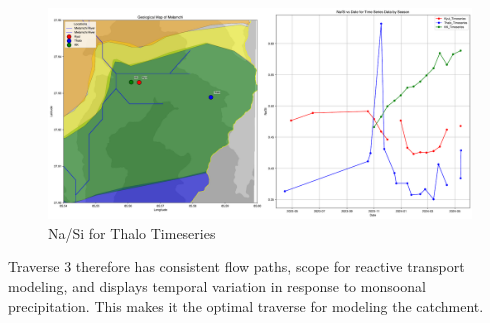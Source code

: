  \begin{figure}[h]
    \centering
    \includegraphics[width=\textwidth]{Na_Si_thalo.pdf}
    \caption{Na/Si for Thalo Timeseries}
    \label{fig:spatial_changes_spring9}
\end{figure}
\FloatBarrier

Traverse 3 therefore has consistent flow paths, scope for reactive transport modeling, and displays temporal variation in response to monsoonal precipitation. This makes it the optimal traverse for modeling the catchment.


